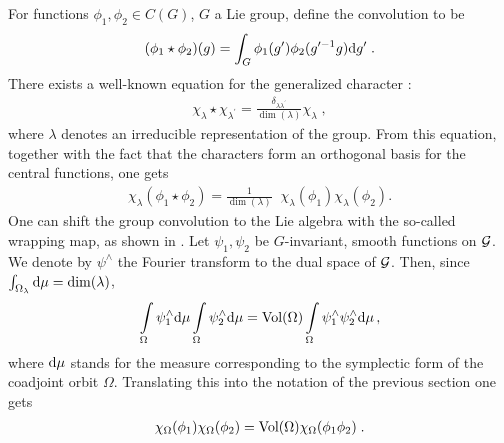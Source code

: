\documentclass[a4paper,twoside,11pt]{article}
\numberwithin{equation}{section}
\begin{document}
For functions $\phi_1,\phi_2\in C(G)$, $G$ a Lie group, define the convolution to be
\begin{gather}
(\phi_1\star\phi_2)(g)=\int_G\phi_1(g^\prime)\phi_2(g^{\prime -1}g)\mathrm d g'\;.
\end{gather}
There exists a well-known equation for the generalized character \cite{WL} :
\begin{gather}
\chi_\lambda\star\chi_{\lambda^\prime}=\frac{\delta_{\lambda\lambda^\prime}}{\dim(\lambda)}\chi_\lambda\;,
\end{gather}
where $\lambda$ denotes an irreducible representation of the group. From this equation, together with the fact that the characters form an orthogonal basis for the central 
functions, one gets
\begin{gather}
\chi_\lambda(\phi_1\star\phi_2)=\frac{1}{\dim(\lambda)}\;\;\chi_\lambda(\phi_1)\chi_\lambda(\phi_2).
\end{gather}
One can shift the group convolution to the Lie algebra with the so-called 
wrapping map, as shown in \cite{DW}. Let $\psi_1,\psi_2$ be $G$-invariant, smooth functions on $\mathcal{G}$. We denote by $\psi^\wedge$  the Fourier transform to the dual space of $\mathcal{G}$. Then, since 
$\int_{\Omega_\lambda}\mathrm d\mu=\dim(\lambda)$, 
\begin{gather}
\int\limits_\Omega\psi_1^\wedge\mathrm d\mu\int\limits_\Omega\psi_2^\wedge\mathrm d\mu=\text{Vol}(\Omega)
\int\limits_\Omega\psi_1^\wedge\psi_2^\wedge\mathrm d\mu\,,
\end{gather}
where $\mathrm d\mu$ stands for the measure corresponding to the symplectic form of the coadjoint orbit $\Omega$. 
Translating this into the notation of the previous section one gets
\begin{gather}
\chi_\Omega(\phi_1)\chi_\Omega(\phi_2)=\text{Vol}(\Omega)\chi_\Omega(\phi_1\phi_2)\;.
\label{ident}\end{gather}
\end{document}
